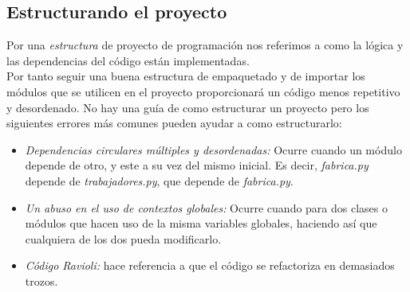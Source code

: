 \subsection*{Estructurando el proyecto}
\label{subsec:structurePython}
Por una \emph{estructura} de proyecto de programación nos referimos a como la lógica y las dependencias del código están implementadas. \\
Por tanto seguir una buena estructura de empaquetado y de importar los módulos que se utilicen en el proyecto proporcionará un código menos repetitivo y desordenado. No hay una guía de como estructurar un proyecto pero los siguientes errores más comunes pueden ayudar a  como estructurarlo:
\begin{itemize}
    \item \textit{Dependencias circulares múltiples y desordenadas:} Ocurre cuando un módulo depende de otro, y este a su vez del mismo inicial. Es decir, \textit{fabrica.py} depende de \textit{trabajadores.py}, que depende de \textit{fabrica.py}.
    \item \textit{Un abuso en el uso de contextos globales:} Ocurre cuando para dos clases o módulos que hacen uso de la misma variables globales, haciendo así que cualquiera de los dos pueda modificarlo.
    \item \textit{Código Ravioli:} hace referencia a que el código se refactoriza en demasiados trozos.
\end{itemize}

